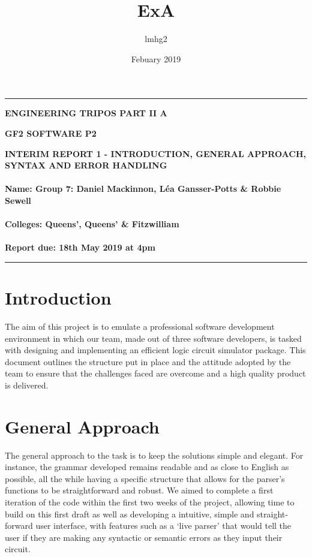\documentclass[12pt]{article}
\title{ExA}
\author{lmhg2 }
\date{Febuary 2019}
\begin{document}
\def\n{\noindent}
\def\u{\underline}
\def\hs{\hspace}
\newcommand{\thrfor}{.^{\displaystyle .} .}
\newcommand{\bvec}[1]{{\bf #1}}

\noindent
\rule{390pt}{0.5mm}

\begin{center}
{\bf ENGINEERING TRIPOS PART II A}
\end{center}
\vspace{0.5cm} {\bf GF2 \hfill SOFTWARE P2}
\vspace{0.5cm}
\begin{center}
{\bf INTERIM REPORT 1 - INTRODUCTION, GENERAL APPROACH, SYNTAX AND ERROR HANDLING \\
\hfill
\\Name: Group 7: Daniel Mackinnon, L\'ea Gansser-Potts \& Robbie Sewell\\\hfill\\
Colleges: Queens', Queens' \& Fitzwilliam\\\hfill\\
Report due: 18th May 2019 at 4pm
}
\end{center}
\rule{390pt}{0.5mm}

\newpage
\section{Introduction}
The aim of this project is to emulate a professional software development environment in which our team, made out of three software developers,  is tasked with designing and implementing an efficient logic circuit simulator package. This document outlines the structure put in place and the attitude adopted by the team to ensure that the challenges faced are overcome and a high quality product is delivered.  

\section{General Approach}
The general approach to the task is to keep the solutions simple and elegant. For instance, the grammar developed remains readable and as close to English as possible, all the while having a specific structure that allows for the parser's functions to be straightforward and robust. We aimed to complete a first iteration of the code within the first two weeks of the project, allowing time to build on this first draft as well as developing a intuitive, simple and straight-forward user interface, with features such as a `live parser' that would tell the user if they are making any syntactic or semantic errors as they input their circuit.\\
\end{document}
